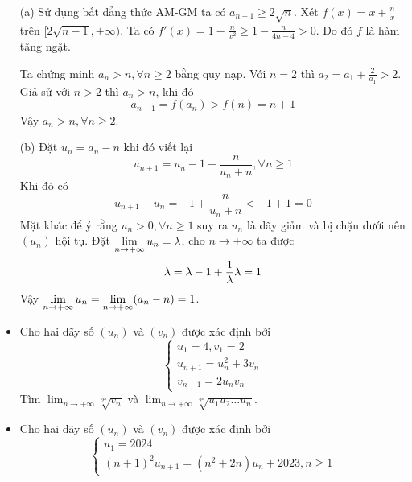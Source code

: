 \documentclass[11pt]{scrartcl}
\begin{document}
\begin{itemize}[label=, leftmargin=0em, itemsep=0.5em]
\begin{sol}
        (a) Sử dụng bất đẳng thức AM-GM ta có $a_{n + 1} \geq 2\sqrt{n}$. Xét $f(x) = x + \frac{n}{x}$ trên $[2\sqrt{n - 1},+\infty)$. Ta có $f'(x)= 1 - \frac{n}{x^2} \geq 1 - \frac{n}{4n - 4} > 0$. Do đó $f$ là hàm tăng ngặt. 
        
        Ta chứng minh $a_n > n, \forall n \geq 2$ bằng quy nạp. Với $n = 2$ thì $a_2 = a_1 + \frac{2}{a_1} > 2$. Giả sử với $n > 2$ thì $a_n > n$, khi đó 
        \[
            a_{n + 1} = f(a_n) > f(n) = n + 1
        \]
        Vậy $a_n > n, \forall n \geq 2$.

        (b) Đặt $u_n = a_n - n$ khi đó viết lại 
        \[
            u_{n + 1}  = u_n - 1 + \frac{n}{u_n + n}, \forall n \geq 1
        \]
        Khi đó có 
        \[
            u_{n + 1} - u_n = -1 + \frac{n}{u_n +n} < -1 + 1 = 0
        \]
        Mặt khác để ý rằng $u_n > 0, \forall n \geq 1$ suy ra $u_n$ là dãy giảm và bị chặn dưới nên $(u_n)$ hội tụ. Đặt $\displaystyle\lim_{n \to +\infty} u_n = \lambda$, cho $n \to +\infty$ ta được 
        \[
            \lambda = \lambda - 1 + \frac{1}{\lambda} \ra \lambda = 1
        \]
        Vậy $\displaystyle\lim_{n \to +\infty} u_n = \displaystyle\lim_{n \to +\infty} (a_n - n) = 1$.
    \end{sol}
    \item \begin{btvn}
        Cho hai dãy số $(u_n)$ và $(v_n)$ được xác định bởi
        \[
            \left\{
                \begin{array}{l}
                    u_1 = 4, v_1 = 2\\
                    u_{n + 1} = u_n^2 + 3v_n\\
                    v_{n + 1} =2u_nv_n
                \end{array}
            \right.
        \]
        Tìm $\displaystyle \lim_{n \to +\infty}\sqrt[2^n]{v_n}$ và $\displaystyle \lim_{n \to +\infty}\sqrt[2^n]{u_1u_2\dots u_n}$.
    \end{btvn}
    \item \begin{btvn}
        Cho hai dãy số $(u_n)$ và $(v_n)$ được xác định bởi
        \[
            \left\{
                \begin{array}{l}
                    u_1 = 2024\\
                    (n + 1)^2u_{n + 1} =(n^2 + 2n)u_n + 2023, n \geq 1
                \end{array}
\]
\end{btvn}
\end{itemize}
\end{document}
